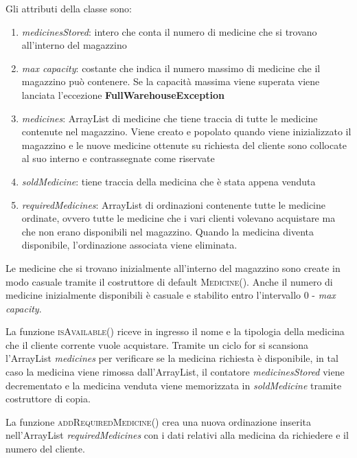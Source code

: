 \documentclass[a4paper, 10pt]{report}
\begin{document}
Gli attributi della classe sono:
\begin{enumerate}
\item \textit{medicinesStored}: intero che conta il numero di medicine che si trovano all'interno del magazzino
\item \textit{max capacity}: costante che indica il numero massimo di medicine che il magazzino può contenere. Se la capacità massima viene superata viene lanciata l'eccezione \textbf{FullWarehouseException}
\item \textit{medicines}: ArrayList di medicine che tiene traccia di tutte le medicine contenute nel magazzino. Viene creato e popolato quando viene inizializzato il magazzino e le nuove medicine ottenute su richiesta del cliente sono collocate al suo interno e contrassegnate come riservate
\item \textit{soldMedicine}: tiene traccia della medicina che è stata appena venduta
\item \textit{requiredMedicines}: ArrayList di ordinazioni contenente tutte le medicine ordinate, ovvero tutte le medicine che i vari clienti volevano acquistare ma che non erano disponibili nel magazzino. Quando la medicina diventa disponibile, l'ordinazione associata viene eliminata.
\end{enumerate}
Le medicine che si trovano inizialmente all'interno del magazzino sono create in modo casuale tramite il costruttore di default \textsc{Medicine()}. Anche il numero di medicine inizialmente disponibili è casuale e stabilito entro l'intervallo 0 - \textit{max capacity}. 

La funzione \textsc{isAvailable()} riceve in ingresso il nome e la tipologia della medicina che il cliente corrente vuole acquistare. Tramite un ciclo for si scansiona l'ArrayList \textit{medicines} per verificare se la medicina richiesta è disponibile, in tal caso la medicina viene rimossa dall'ArrayList, il contatore \textit{medicinesStored} viene decrementato e la medicina venduta viene memorizzata in \textit{soldMedicine} tramite costruttore di copia.

La funzione \textsc{addRequiredMedicine()} crea una nuova ordinazione inserita nell'ArrayList \textit{requiredMedicines} con i dati relativi alla medicina da richiedere e il numero del cliente.
\end{document}
